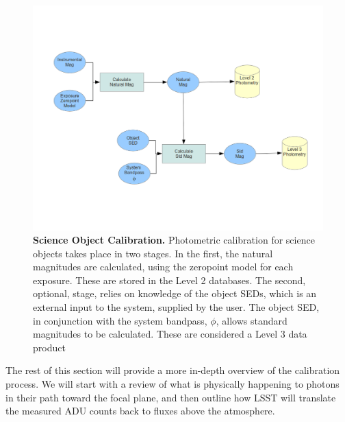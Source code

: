 \documentclass[12pt,preprint]{aastex}
\begin{document}
\begin{figure}[htbp]
\includegraphics[width=6.5in]{CalibDataProdSchematic4}
\caption{ {\small {\bf Science Object Calibration.}  Photometric calibration for science objects takes place in two stages.  In the first, the natural magnitudes are calculated, using the zeropoint model for each exposure.  These are stored in the Level 2 databases.  The second, optional, stage, relies on knowledge of the object SEDs, which is an external input to the system, supplied by the user.   The object SED, in conjunction with the system bandpass, $\phi$, allows standard magnitudes to be calculated.  These are considered a Level 3 data product }
\label{fig:overview_flowchart4} }
\end{figure}

The rest of this section will provide a more in-depth overview of the
calibration process. We will start with a review of what
is physically happening to photons in their path toward the focal
plane, and then outline how LSST will translate the
measured ADU counts back to fluxes above the atmosphere.
\end{document}
